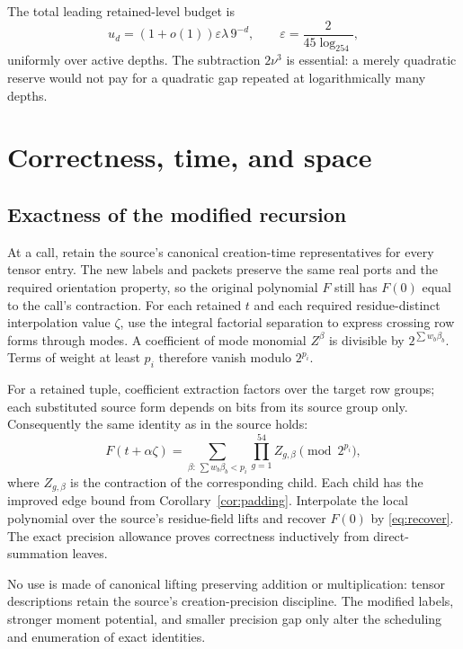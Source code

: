 \documentclass[11pt]{article}
\theoremstyle{remark}\newtheorem{remark}[theorem]{Remark}
\newcommand{\lp}{\log_2}
\begin{document}
The total leading retained-level budget is
\begin{equation}
 u_d=(1+o(1))\varepsilon\lambda\,9^{-d},
 \qquad \varepsilon=\frac{2}{45\lp54},
 \label{eq:epsilon}
\end{equation}
uniformly over active depths. The subtraction $2\nu^3$ is essential: a merely quadratic reserve would not pay for a quadratic gap repeated at logarithmically many depths.

\section{Correctness, time, and space}
\label{sec:cost}

\subsection{Exactness of the modified recursion}
At a call, retain the source's canonical creation-time representatives for every tensor entry. The new labels and packets preserve the same real ports and the required orientation property, so the original polynomial $F$ still has $F(0)$ equal to the call's contraction. For each retained $t$ and each required residue-distinct interpolation value $\zeta$, use the integral factorial separation to express crossing row forms through modes. A coefficient of mode monomial $Z^\beta$ is divisible by $2^{\sum w_b\beta_b}$. Terms of weight at least $p_i$ therefore vanish modulo $2^{p_i}$.

For a retained tuple, coefficient extraction factors over the target row groups; each substituted source form depends on bits from its source group only. Consequently the same identity as in the source holds:
\[
 F(t+\alpha\zeta)
 =\sum_{\beta:\,\sum w_b\beta_b<p_i}
     \prod_{g=1}^{54}Z_{g,\beta}\pmod{2^{p_i}},
\]
where $Z_{g,\beta}$ is the contraction of the corresponding child. Each child has the improved edge bound from Corollary~\ref{cor:padding}. Interpolate the local polynomial over the source's residue-field lifts and recover $F(0)$ by \eqref{eq:recover}. The exact precision allowance proves correctness inductively from direct-summation leaves.

No use is made of canonical lifting preserving addition or multiplication: tensor descriptions retain the source's creation-precision discipline. The modified labels, stronger moment potential, and smaller precision gap only alter the scheduling and enumeration of exact identities.
\end{document}
